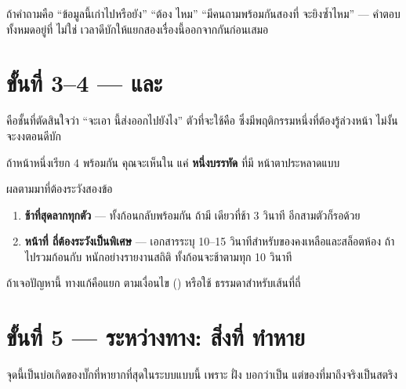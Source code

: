 \begin{keybox}[title={แบ่งงานให้ชัด: \en{tRPC} ยิงกับให้ \en{type} · \en{TanStack Query} จำและตัดสินใจว่าจะยิงเมื่อไร}]
ถ้าคำถามคือ ``ข้อมูลนี้เก่าไปหรือยัง'' ``ต้อง  ไหม'' ``มีคนถามพร้อมกันสองที่
จะยิงซ้ำไหม'' --- คำตอบทั้งหมดอยู่ที่  ไม่ใช่ 
เวลาดีบักให้แยกสองเรื่องนี้ออกจากกันก่อนเสมอ
\end{keybox}

\section{ขั้นที่ 3--4 ---  และ }

 คือชั้นที่ตัดสินใจว่า ``จะเอา  นี้ส่งออกไปยังไง'' ตัวที่จะใช้คือ
 ซึ่งมีพฤติกรรมหนึ่งที่ต้องรู้ล่วงหน้า ไม่งั้นจะงงตอนดีบัก

\begin{warnbox}[title={\en{httpBatchLink} รวมหลาย \en{query} เป็น \en{request} เดียว --- \en{Network} \en{tab} จะไม่ตรงกับที่คิด}]
ถ้าหน้าหนึ่งเรียก 4  พร้อมกัน คุณจะเห็นใน  แค่
\textbf{หนึ่งบรรทัด} ที่มี  หน้าตาประหลาดแบบ

ผลตามมาที่ต้องระวังสองข้อ

\begin{enumerate}
\item \textbf{ช้าที่สุดลากทุกตัว} ---  ทั้งก้อนกลับพร้อมกัน ถ้ามี
       เดียวที่ช้า 3 วินาที อีกสามตัวก็รอด้วย
\item \textbf{หน้าที่  ถี่ต้องระวังเป็นพิเศษ} --- เอกสารระบุ
       10--15 วินาทีสำหรับของคงเหลือและสล็อตห้อง ถ้าไปรวมก้อนกับ
       หนักอย่างรายงานสถิติ ทั้งก้อนจะช้าตามทุก 10 วินาที
\end{enumerate}

ถ้าเจอปัญหานี้ ทางแก้คือแยก  ตามเงื่อนไข () หรือใช้
 ธรรมดาสำหรับเส้นที่ถี่
\end{warnbox}

\section{ขั้นที่ 5 --- ระหว่างทาง: สิ่งที่  ทำหาย}
\label{sec:json}

จุดนี้เป็นบ่อเกิดของบั๊กที่หายากที่สุดในระบบแบบนี้ เพราะ  ฝั่ง
 บอกว่าเป็น  แต่ของที่มาถึงจริงเป็นสตริง

